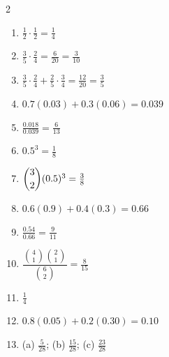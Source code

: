 \documentclass[11pt]{article}
\begin{document}
\begin{keybox}
\begin{multicols}{2}
\small
\begin{enumerate}[leftmargin=*,itemsep=3pt]
  \item $\tfrac12\cdot\tfrac12=\tfrac14$
  \item $\tfrac35\cdot\tfrac24=\tfrac{6}{20}=\tfrac{3}{10}$
  \item $\tfrac35\cdot\tfrac24+\tfrac25\cdot\tfrac34=\tfrac{12}{20}=\tfrac35$
  \item $0.7(0.03)+0.3(0.06)=0.039$
  \item $\tfrac{0.018}{0.039}=\tfrac{6}{13}$
  \item $0.5^3=\tfrac18$
  \item $\dbinom{3}{2}(0.5)^3=\tfrac38$
  \item $0.6(0.9)+0.4(0.3)=0.66$
  \item $\tfrac{0.54}{0.66}=\tfrac{9}{11}$
  \item $\dfrac{\binom{4}{1}\binom{2}{1}}{\binom{6}{2}}=\tfrac{8}{15}$
  \item $\tfrac14$
  \item $0.8(0.05)+0.2(0.30)=0.10$
  \item (a) $\tfrac{5}{28}$; (b) $\tfrac{15}{28}$; (c) $\tfrac{23}{28}$
\end{enumerate}
\end{multicols}
\end{keybox}
\end{document}
